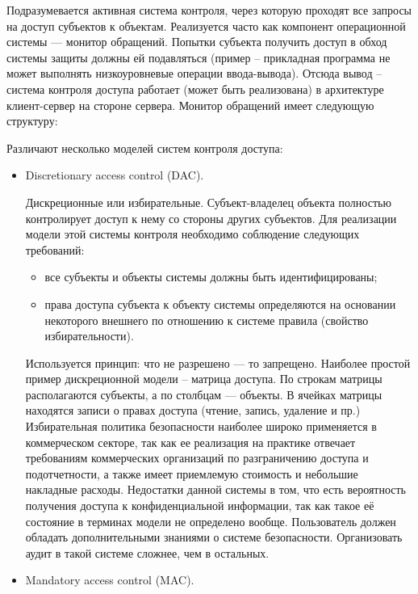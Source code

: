 Подразумевается активная система контроля, через которую проходят все запросы на доступ субъектов к объектам. Реализуется часто как компонент операционной системы --- монитор обращений. Попытки субъекта получить доступ в обход системы защиты должны ей подавляться (пример – прикладная программа не может выполнять низкоуровневые операции ввода-вывода). Отсюда вывод – система контроля доступа работает (может быть реализована) в архитектуре клиент-сервер на стороне сервера. 
Монитор обращений имеет следующую структуру:

Различают несколько моделей систем контроля доступа:
\begin{itemize}


\item Discretionary access control (DAC). 

Дискреционные или избирательные. Субъект-владелец объекта полностью контролирует доступ к нему со стороны других субъектов. Для реализации модели этой системы контроля необходимо соблюдение следующих требований: 

\begin{itemize}
\item все субъекты и объекты системы должны быть идентифицированы; 
\item права доступа субъекта к объекту системы определяются на основании некоторого внешнего по отношению к системе правила (свойство избирательности). 
\end{itemize}

Используется принцип: что не разрешено --- то запрещено. Наиболее простой пример дискреционной модели – матрица доступа. По строкам матрицы располагаются субъекты, а по столбцам --- объекты. В ячейках матрицы находятся записи о правах доступа (чтение, запись, удаление и пр.)
Избирательная политика безопасности наиболее широко применяется в коммерческом секторе, так как ее реализация на практике отвечает требованиям коммерческих организаций по разграничению доступа и подотчетности, а также имеет приемлемую стоимость и небольшие накладные расходы. Недостатки данной системы в том, что есть вероятность получения доступа к конфиденциальной информации, так как такое её состояние в терминах модели не определено вообще. Пользователь должен обладать дополнительными знаниями о системе безопасности. Организовать аудит в такой системе сложнее, чем в остальных.


\item Mandatory access control (MAC). 


\end{itemize}
